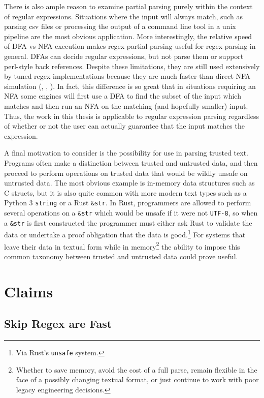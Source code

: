 There is also ample reason to examine partial parsing purely
within the context of regular expressions. Situations where the input
will always match, such as parsing csv files
or processing the output of a command line tool in a unix pipeline
are the most obvious application. More interestingly, the
relative speed of DFA vs NFA execution makes regex partial parsing
useful for regex parsing in general. DFAs can decide regular expressions,
but not parse them or support perl-style back references. Despite
these limitations, they are still used extensively by tuned regex
implementations because they are much faster than direct NFA
simulation (\cite{CoxRE2}, \cite{GallantRegex}, \cite{GoLang}).
In fact, this difference is so great that in situations requiring
an NFA some engines will first use a DFA to find the subset of the input
which matches and then run an NFA on the matching (and hopefully
smaller) input. Thus, the work in this thesis is applicable
to regular expression parsing regardless of whether or not the user
can actually guarantee that the input matches the expression.

A final motivation to consider is the possibility for use
in parsing trusted text. Programs often make a distinction between
trusted and untrusted data, and then proceed to perform operations
on trusted data that would be wildly unsafe on untrusted data.
The most obvious example is in-memory data structures such as C structs, but
it is also quite common with more modern text types such as
a Python 3 \verb'string' or a Rust \verb'&str'. In Rust, programmers
are allowed to perform several operations on a \verb'&str' which
would be unsafe if it were not \verb'UTF-8', so when a \verb'&str'
is first constructed the programmer must either ask Rust to validate
the data or undertake a proof obligation that the data is good.\footnote{
Via Rust's {\tt unsafe} system.} For systems that leave
their data in textual form while in memory\footnote{
Whether to save memory, avoid the cost of a full parse, remain
flexible in the face of a possibly changing textual format, or
just continue to work with poor legacy engineering decisions.}
the ability to impose this common taxonomy between trusted and
untrusted data could prove useful.

\section{Claims}

\subsection{Skip Regex are Fast}

